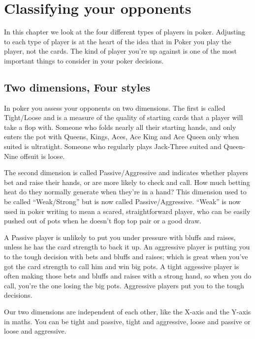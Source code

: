 \chapter{Classifying your opponents}


In this chapter we look at the four different types of players in
poker. Adjusting to each type of player is at the heart of the idea
that in Poker you play the player, not the cards. The kind of player
you're up against is one of the most important things to consider in
your poker decisions.

\section{Two dimensions, Four styles}

In poker you assess your opponents on two dimensions.
The first is called Tight/Loose and is a measure of the quality
of starting cards that a player will take a flop with. Someone
who folds nearly all their starting hands, and
only enters the pot with Queens, Kings, Aces, Ace King and
Ace Queen only when suited is ultratight. Someone who regularly plays
Jack-Three suited and Queen-Nine offsuit is loose.

The second dimension is called Passive/Aggressive and indicates
whether players bet and raise their hands, or are more likely
to check and call. How much betting heat do they normally generate
when they're in a hand? This dimension used to be called ``Weak/Strong''
but is now called Passive/Aggressive. ``Weak'' is now used in poker
writing to mean a scared, straightforward player, who can be
easily pushed out of pots when he doesn't flop top pair or a good
draw.

A Passive player is unlikely to put you under pressure with bluffs and
raises, unless he has the card strength to back it up. An aggressive
player is putting you to the tough decision with bets and bluffs and
raises; which is great when you've got the card strength to call him
and win big pots. A tight aggessive player is often making those bets and
bluffs and raises with a strong hand, so when you do call, you're
the one losing the big pots. Aggressive players put you to the tough
decisions.

Our two dimensions are independent of each other, like the X-axis
and the Y-axis in maths. You can be tight and passive, tight
and aggressive, loose and passive or loose and aggressive.

